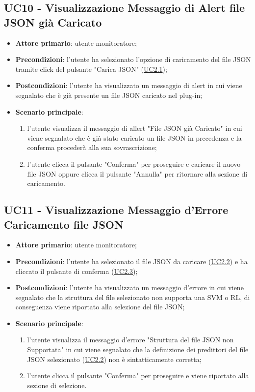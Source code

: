 
	\label{par:UC10}
	\subsection{UC10 - Visualizzazione Messaggio di Alert file JSON già Caricato}
		\begin{itemize}
			\item\textbf{Attore primario}: utente monitoratore;
			\item\textbf{Precondizioni}: l’utente ha selezionato l'opzione di caricamento del file JSON tramite click del pulsante "Carica JSON" (\hyperref[par:UC2.1]{UC2.1});
			\item\textbf{Postcondizioni}: l’utente ha visualizzato un messaggio di alert in cui viene segnalato che è già presente un file JSON caricato nel plug-in; 
			\item\textbf{Scenario principale}: 
				\begin{enumerate} 
					\item l’utente visualizza il messaggio di allert "File JSON già Caricato" in cui viene segnalato che è già stato caricato un file JSON in precedenza e la conferma procederà alla sua sovrascrizione;
					\item l'utente clicca il pulsante "Conferma" per proseguire e caricare il nuovo file JSON oppure clicca il pulsante "Annulla" per ritornare alla sezione di caricamento.
				\end{enumerate}
		\end{itemize}	


	\label{par:UC11}
	\subsection{UC11 - Visualizzazione Messaggio d'Errore Caricamento file JSON }
		\begin{itemize}
			\item\textbf{Attore primario}: utente monitoratore;
			\item\textbf{Precondizioni}: l’utente ha selezionato il file JSON da caricare (\hyperref[par:UC2.2]{UC2.2}) e ha cliccato il pulsante di conferma (\hyperref[par:UC2.3]{UC2.3});
			\item\textbf{Postcondizioni}: l’utente ha visualizzato un messaggio d'errore in cui viene segnalato che la struttura del file selezionato non supporta una SVM o RL, di conseguenza viene riportato alla selezione del file JSON; 
			\item\textbf{Scenario principale}: 
				\begin{enumerate} 
					\item l’utente visualizza il messaggio d'errore "Struttura del file JSON non Supportata" in cui viene segnalato che la definizione dei predittori del file JSON selezionato (\hyperref[par:UC2.2]{UC2.2}) non è sintatticamente corretta;
					\item l'utente clicca il pulsante "Conferma" per proseguire e viene riportato alla sezione di selezione.
				\end{enumerate}
		\end{itemize}	

